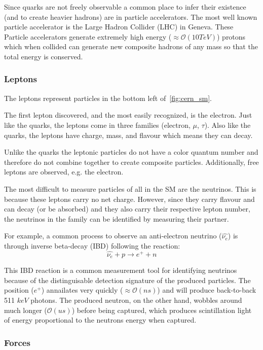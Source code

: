 Since quarks are not freely observable a common place to infer their existence (and to create heavier hadrons) are in particle accelerators.
The most well known particle accelerator is the Large Hadron Collider (LHC) in Geneva.
These Particle accelerators generate extremely high energy ($\approx \mathcal{O}(10 TeV)$) protons which when collided can generate new composite hadrons of any mass so that the total energy is conserved.


\subsubsection{Leptons}

The leptons represent particles in the bottom left of~\ref{fig:cern_sm}.

The first lepton discovered, and the most easily recognized, is the electron.
Just like the quarks, the leptons come in three families (electron, $\mu$, $\tau$).
Also like the quarks, the leptons have charge, mass, and flavour which means they can decay.

Unlike the quarks the leptonic particles do not have a color quantum number and therefore do not combine together to create composite particles.
Additionally, free leptons are observed, e.g. the electron.

The most difficult to measure particles of all in the SM are the neutrinos.
This is because these leptons carry no net charge.
However, since they carry flavour and can decay (or be absorbed) and they also carry their respective lepton number, the neutrinos in the family can be identified by measuring their partner.

For example, a common process to observe an anti-electron neutrino ($\hat{\nu_{e}}$) is through inverse beta-decay (IBD) following the reaction:
\begin{equation}
\hat{\nu_{e}} + p \rightarrow e^{+} + n
\end{equation}

This IBD reaction is a common measurement tool for identifying neutrinos because of the distinguisable detection signature of the produced particles.
The position ($e^{+}$) annailates very quickly ($\approx \mathcal{O}(ns)$) and will produce back-to-back 511 $keV$ photons.
The produced neutron, on the other hand, wobbles around much longer ($\mathcal{O}(us)$) before being captured, which produces scintillation light of energy proportional to the neutrons energy when captured.

\subsubsection{Forces}

